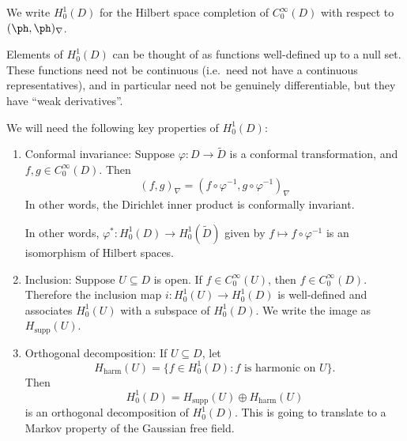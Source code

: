 \documentclass[a4paper]{article}
\begin{document}
\begin{defi}[$H_0^1(D)$]
  We write $H_0^1(D)$ for the Hilbert space completion of $C_0^\infty(D)$ with respect to $(\ph, \ph)_{\nabla}$.
\end{defi}
Elements of $H_0^1(D)$ can be thought of as functions well-defined up to a null set. These functions need not be continuous (i.e.\ need not have a continuous representatives), and in particular need not be genuinely differentiable, but they have ``weak derivatives''.

We will need the following key properties of $H_0^1(D)$: 
\begin{prop}\leavevmode
  \begin{enumerate}
    \item Conformal invariance: Suppose $\varphi: D \to \tilde{D}$ is a conformal transformation, and $f, g \in C_0^\infty(D)$. Then
      \[
        (f, g)_\nabla = (f \circ \varphi^{-1}, g \circ \varphi^{-1})_\nabla
      \]
      In other words, the Dirichlet inner product is conformally invariant.

      In other words, $\varphi^*: H_0^1(D) \to H_0^1(\tilde{D})$ given by $f \mapsto f \circ \varphi^{-1}$ is an isomorphism of Hilbert spaces.
    \item Inclusion: Suppose $U \subseteq D$ is open. If $f \in C_0^\infty(U)$, then $f \in C_0^\infty(D)$. Therefore the inclusion map $i: H_0^1(U) \to H_0^1(D)$ is well-defined and associates $H_0^1(U)$ with a subspace of $H_0^1(D)$. We write the image as $H_{\mathrm{supp}}(U)$.
    \item Orthogonal decomposition: If $U \subseteq D$, let
      \[
        H_{\mathrm{harm}}(U) = \{f \in H_0^1(D): f\text{ is harmonic on }U\}.
      \]
      Then
      \[
        H_0^1(D) = H_{\mathrm{supp}}(U) \oplus H_{\mathrm{harm}}(U)
      \]
      is an orthogonal decomposition of $H_0^1(D)$. This is going to translate to a Markov property of the Gaussian free field.
  \end{enumerate}
\end{prop}
\end{document}
